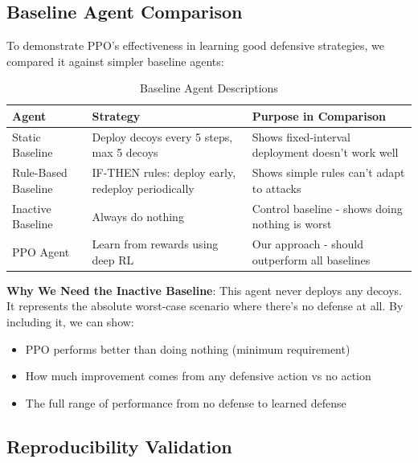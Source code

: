 \documentclass[12pt,oneside]{article}
\begin{document}
\subsection{Baseline Agent Comparison}

To demonstrate PPO's effectiveness in learning good defensive strategies, we compared it against simpler baseline agents:

\begin{table}[H]
\centering
\caption{Baseline Agent Descriptions}
\label{tab:baseline_agents}
\small
\begin{tabular}{|p{2.5cm}|p{4cm}|p{5.5cm}|}
\hline
\rowcolor{cwBorder!30} \textbf{Agent} & \textbf{Strategy} & \textbf{Purpose in Comparison} \\
\hline
Static Baseline & Deploy decoys every 5 steps, max 5 decoys & Shows fixed-interval deployment doesn't work well \\
\hline
Rule-Based Baseline & IF-THEN rules: deploy early, redeploy periodically & Shows simple rules can't adapt to attacks \\
\hline
Inactive Baseline & Always do nothing & Control baseline - shows doing nothing is worst \\
\hline
PPO Agent & Learn from rewards using deep RL & Our approach - should outperform all baselines \\
\hline
\end{tabular}
\end{table}

\textbf{Why We Need the Inactive Baseline}: This agent never deploys any decoys. It represents the absolute worst-case scenario where there's no defense at all. By including it, we can show:
\begin{itemize}
\item PPO performs better than doing nothing (minimum requirement)
\item How much improvement comes from any defensive action vs no action
\item The full range of performance from no defense to learned defense
\end{itemize}

\subsection{Reproducibility Validation}
\end{document}
